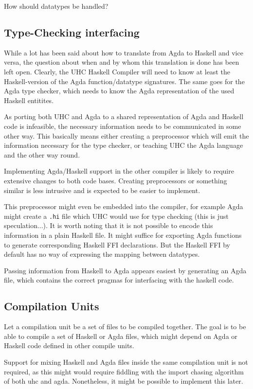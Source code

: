\documentclass[12pt, a4paper, twoside]{report}
\begin{document}
How should datatypes be handled?

\subsection{Type-Checking interfacing}
While a lot has been said about how to translate from Agda to Haskell and vice versa,
the question about when and by whom this translation is done has been left open. Clearly,
the UHC Haskell Compiler will need to know at least the Haskell-version of the Agda
function/datatype signatures. The same goes for the Agda type checker, which needs to
know the Agda representation of the used Haskell entitites.

As porting both UHC and Agda to a shared representation of Agda and Haskell code
is infeasible, the necessary information needs to be communicated in some other way.
This basically means either creating a preprocessor which will emit the information
necessary for the type checker, or teaching UHC the Agda language and the other way round.

Implementing Agda/Haskell support in the other compiler is likely to require extensive changes
to both code bases. Creating preprocessors or something similar is less intrusive and is expected
to be easier to implement.

This preprocessor might even be embedded into the compiler, for example Agda might create
a \texttt{.hi} file which UHC would use for type checking (this is just speculation...). It is worth noting
that it is not possible to encode this information in a plain Haskell file. It might suffice for
exporting Agda functions to generate corresponding Haskell FFI declarations. But the Haskell FFI
by default has no way of expressing the mapping between datatypes.

Passing information from Haskell to Agda appears easiest by generating an Agda file,
which contains the correct pragmas for interfacing with the haskell code.

\subsection{Compilation Units}
Let a compilation unit be a set of files to be compiled together. The goal is to be able to compile a set of
Haskell or Agda files, which might depend on Agda or Haskell code defined in other compile units.

Support for mixing Haskell and Agda files inside the same compilation unit is not required, as this
might would require fiddling with the import chasing algorithm of both uhc and agda. Nonetheless,
it might be possible to implement this later.
\end{document}

